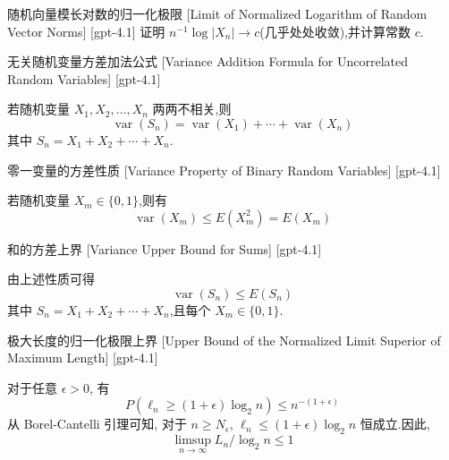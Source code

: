 \documentclass[UTF8]{ctexart}
\begin{document}
    
    
    \begin{thm}
        {随机向量模长对数的归一化极限}
        [Limit of Normalized Logarithm of Random Vector Norms]
        [gpt-4.1]
        证明 $n^{-1} \log |X_n| \to c$(几乎处处收敛),并计算常数 $c$.
    \end{thm}
    
    
    
    \begin{thm}
        {无关随机变量方差加法公式}
        [Variance Addition Formula for Uncorrelated Random Variables]
        [gpt-4.1]
        
若随机变量 $X_1, X_2, \ldots, X_n$ 两两不相关,则
\[
\operatorname{var}(S_n) = \operatorname{var}(X_1) + \cdots + \operatorname{var}(X_n)
\]
其中 $S_n = X_1 + X_2 + \cdots + X_n$.

    \end{thm}
    
    
    
    \begin{ppt}
        {零一变量的方差性质}
        [Variance Property of Binary Random Variables]
        [gpt-4.1]
        
若随机变量 $X_m \in \{0,1\}$,则有
\[
\operatorname{var}(X_m) \leq E(X_m^2) = E(X_m)
\]

    \end{ppt}
    
    
    
    \begin{crl}
        {和的方差上界}
        [Variance Upper Bound for Sums]
        [gpt-4.1]
        
由上述性质可得
\[
\operatorname{var}(S_n) \leq E(S_n)
\]
其中 $S_n = X_1 + X_2 + \cdots + X_n$,且每个 $X_m \in \{0,1\}$.

    \end{crl}
    
    
    
    \begin{crl}
        {极大长度的归一化极限上界}
        [Upper Bound of the Normalized Limit Superior of Maximum Length]
        [gpt-4.1]
        
对于任意 $\epsilon > 0$, 有
\[
P(\ell_{n} \geq (1+\epsilon)\log_{2} n) \leq n^{-(1+\epsilon)}
\]
从 Borel-Cantelli 引理可知, 对于 $n \geq N_{\epsilon}$, $\ell_{n} \leq (1+\epsilon)\log_{2} n$ 恒成立.因此,
\[
\limsup_{n \to \infty} L_{n} / \log_{2} n \leq 1
\]

    \end{crl}
    
\end{document}
